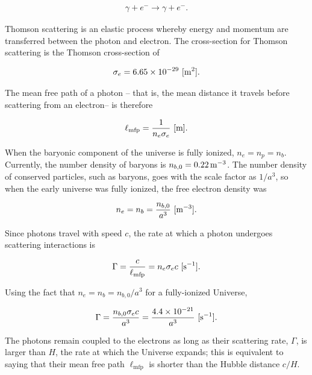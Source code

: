 \documentclass[a4paper,11pt]{article}
\begin{document}
\begin{align*}
    \gamma + e^{-} \rightarrow \gamma + e^{-}.
\end{align*}

{\noindent}Thomson scattering is an elastic process whereby energy and momentum are transferred between the photon and electron. The cross-section for Thomson scattering is the Thomson cross-section of 

\begin{align*}
    \sigma_e = 6.65 \times 10^{-29} ~ [{\rm m^2}].
\end{align*}

{\noindent}The mean free path of a photon -- that is, the mean distance it travels before scattering from an electron-- is therefore

\begin{align*}
    \ell_\mathrm{mfp} = \frac{1}{n_e\sigma_e} ~ [{\rm m}].
\end{align*}

{\noindent}When the baryonic component of the universe is fully ionized, $n_e = n_p = n_b$. Currently, the number density of baryons is $n_{b,0} = 0.22\,{\rm m^{-3}}$. The number density of conserved particles, such as baryons, goes with the scale factor as $1/a^3$, so when the early universe was fully ionized, the free electron density was

\begin{align*}
    n_e = n_b = \frac{n_{b,0}}{a^3} ~ [{\rm m^{-3}}].
\end{align*}

{\noindent}Since photons travel with speed $c$, the rate at which a photon undergoes scattering interactions is

\begin{align*}
    \Gamma = \frac{c}{\ell_\mathrm{mfp}} = n_e\sigma_ec ~ [{\rm s^{-1}}].
\end{align*}

{\noindent}Using the fact that $n_e = n_b = n_{b,0}/a^3$ for a fully-ionized Universe,

\begin{align*}
    \Gamma = \frac{n_{b,0}\sigma_ec}{a^3} = \frac{4.4\times10^{-21}}{a^3} ~ [{\rm s^{-1}}].
\end{align*}

{\noindent}The photons remain coupled to the electrons as long as their scattering rate, $\Gamma$, is larger than $H$, the rate at which the Universe expands; this is equivalent to saying that their mean free path $\ell_\mathrm{mfp}$ is shorter than the Hubble distance $c/H$.
\end{document}
